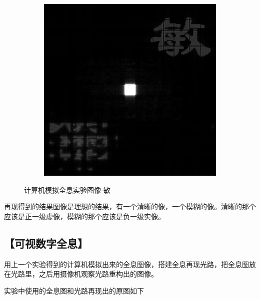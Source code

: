 \documentclass{ctexart}
\let\oldsubsection\subsection
\renewcommand{\subsection}[1]{\oldsubsection{\!\!\!\!\!\!【#1】}}
\begin{document}
\begin{figure}[H]
\begin{subfigure}{.32\textwidth}
  \end{subfigure}
  \begin{subfigure}{.32\textwidth}
    \includegraphics[width=\linewidth]{数字全息实验数据/计算机模拟全息/用软件重建的结果图像/5-敏-重建.jpg}
  \end{subfigure}
  \caption{计算机模拟全息实验图像-敏}
\end{figure}

再现得到的结果图像是理想的结果，有一个清晰的像，一个模糊的像。清晰的那个应该是正一级虚像，模糊的那个应该是负一级实像。

\subsection{可视数字全息}

用上一个实验得到的计算机模拟出来的全息图像，搭建全息再现光路，把全息图放在光路里，之后用摄像机观察光路重构出的图像。

实验中使用的全息图和光路再现出的原图如下
\end{document}
